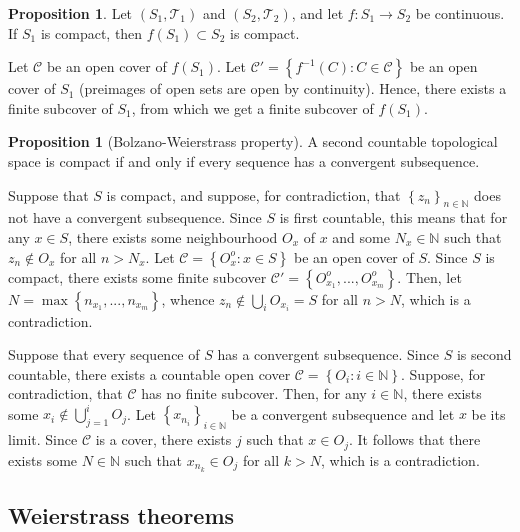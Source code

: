 \documentclass[11pt]{article}
\theoremstyle{definition}
\newtheorem{prop}[thm]{Proposition}
\newcommand{\set}[1]{\left\{ #1 \right\}}
\newcommand{\NN}{\mathbb{N}}
\newcommand{\m}[1]{\mathcal{#1}}
\begin{document}
\begin{prop}
Let $(S_1,\m{T}_1)$ and $(S_2,\m{T}_2)$, and let $f:S_1\to S_2$ be continuous. If $S_1$ is
compact, then $f(S_1)\subset S_2$ is compact.
\end{prop}
\proof
Let $\m{C}$ be an open cover of $f(S_1)$. Let $\m{C}'=\set{f^{-1}(C):C\in\m{C}}$ be an open
cover of $S_1$ (preimages of open sets are open by continuity). Hence, there exists a
finite subcover of $S_1$, from which we get a finite subcover of $f(S_1)$.
\qedhere

\begin{prop}[Bolzano-Weierstrass property]
A second countable topological space is compact if and only if every sequence has a
convergent subsequence.
\end{prop}
\proof
Suppose that $S$ is compact, and suppose, for contradiction, that $\set{z_n}_{n\in\NN}$
does not have a convergent subsequence. Since $S$ is first countable, this means that for
any $x\in S$, there exists some neighbourhood $O_x$ of $x$ and some $N_x\in\NN$ such that
$z_n\notin O_x$ for all $n>N_x$.  Let $\m{C}=\set{O_x^o:x\in S}$ be an open cover of $S$.
Since $S$ is compact, there exists some finite subcover
$\m{C}'=\set{O_{x_1}^o,...,O_{x_m}^o}$. Then, let $N=\max\set{n_{x_1},...,n_{x_m}}$, whence
$z_n\notin\bigcup_iO_{x_i}=S$ for all $n>N$, which is a contradiction.

Suppose that every sequence of $S$ has a convergent subsequence. Since $S$ is second
countable, there exists a countable open cover $\m{C}=\set{O_i:i\in\NN}$. Suppose, for
contradiction, that $\m{C}$ has no finite subcover. Then, for any $i\in\NN$, there exists
some $x_i\notin\bigcup_{j=1}^iO_j$. Let $\set{x_{n_i}}_{i\in\NN}$ be a convergent
subsequence and let $x$ be its limit. Since $\m{C}$ is a cover, there exists $j$ such that
$x\in O_j$. It follows that there exists some $N\in\NN$ such that $x_{n_k}\in O_j$ for all
$k>N$, which is a contradiction.
\qedhere






\subsection{Weierstrass theorems}
\end{document}
